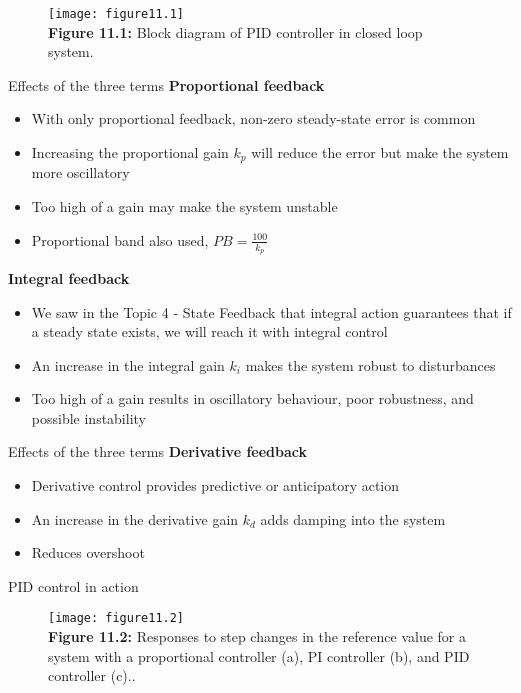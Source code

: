 \documentclass{beamer-control}
\begin{document}
\begin{frame}
\begin{figure}
	\centering
	\texttt{[image: figure11.1]}
	\\
	\textbf{Figure 11.1:} Block diagram of PID controller in closed loop system. 
\end{figure}
\end{frame}


\begin{frame}{Effects of the three terms}
\textbf{Proportional feedback}
\begin{itemize}
\item With only proportional feedback, non-zero steady-state error is common
\item Increasing the proportional gain $k_p$ will reduce the error but make the system more oscillatory
\item Too high of a gain may make the system unstable 
\item Proportional band also used, $PB=\tfrac{100}{k_p}$
\end{itemize}
\textbf{Integral feedback}
\begin{itemize}
	\item We saw in the Topic 4 - State Feedback that integral action guarantees that if a steady state exists, we will reach it with integral control
	\item An increase in the integral gain $k_i$ makes the system robust to disturbances
	\item Too high of a gain results in oscillatory behaviour, poor robustness, and possible instability
\end{itemize}
\end{frame}


\begin{frame}{Effects of the three terms}
	\textbf{Derivative feedback}
	\begin{itemize}
		\item Derivative control provides predictive or anticipatory action
		\item An increase in the derivative gain $k_d$ adds damping into the system
		\item Reduces overshoot
	\end{itemize}
\end{frame}

\begin{frame}{PID control in action}
\begin{figure}
	\centering
	\texttt{[image: figure11.2]}
	\\
	\textbf{Figure 11.2:} Responses to step changes in the reference value for a system with a proportional controller (a), PI controller (b), and PID controller (c).. 
\end{figure}
\end{frame}


\SUMMARYFRAME
\FINALE
\end{document}
